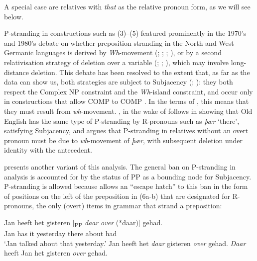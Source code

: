 \documentclass[output=paper]{langsci/langscibook}
\begin{document}
A special case are relatives with \textit{that} as the relative pronoun form,
as we will see below.

P-stranding in constructions such as (3)--(5) featured prominently in the
1970’s and 1980’s debate on whether preposition stranding in the North and West
Germanic languages is derived by \textit{Wh}-movement
(\cite{Chomsky1977,ChomskyLasnik1977}; \cite[286--297]{vanRiemsdijk1978};
\citealt{Vat1978}; \citealt{vanKemenade1987}), or by a second relativisation
strategy of deletion over a variable (\citealt{Maling1976};
\citealt{BresnanGrimshaw1978}; \citealt{Allen1977,Allen1980}), which may
involve long-distance deletion. This debate has been resolved to the extent
that, as far as the data can show us, both strategies are subject to Subjacency
(\citealt{Allen1980}; \citealt{vanKemenade1987}): they both respect the Complex
NP constraint and the \textit{Wh}-island constraint, and occur only in
constructions that allow COMP to COMP . In the terms of
\textcite{Chomsky1977,ChomskyLasnik1977}, this means that they must result from
\textit{wh}-movement. \citet{Vat1978}, in the wake of
\citet{vanRiemsdijk1978} follows \citet{Allen1977} in showing that Old English
has the same type of P-stranding by R-pronouns such
as \textit{þær} ‘there’, satisfying Subjacency, and argues that
P-stranding in relatives without an overt pronoun
must be due to \textit{wh}-movement of \textit{þær}, with subsequent deletion
under identity with the antecedent.

 presents another variant of this analysis. The general
ban on P-stranding in  analysis is accounted for by
the status of PP as a bounding node for Subjacency.  P-stranding is
allowed because  allows an “escape hatch” to this ban in the form of
positions on the left of the preposition in (6a-b) that are designated for
R-pronouns, the only (overt) items in  grammar that strand a preposition:

\ea%
    \label{ex:key:11.6}
    	\ea
	\gll Jan heeft het gisteren [\textsubscript{PP} \textit{daar} \textit{over} (*daar)] gehad.\\
        		Jan has    it   yesterday {}    there  about   {}         had\\
	\glt ‘Jan talked about that yesterday.’
	\ex Jan heeft het \textit{daar} gisteren \textit{over} gehad.
	\ex \textit{Daar} heeft Jan het gisteren \textit{over} gehad.
	\z
\z
\end{document}
